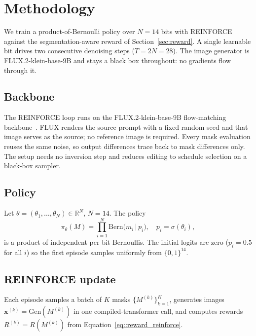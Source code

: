 \chapter{Methodology}
\label{ch:methods}

We train a product-of-Bernoulli policy over $N=14$ bits with REINFORCE against the segmentation-aware reward of Section~\ref{sec:reward}. A single learnable bit drives two consecutive denoising steps ($T=2N=28$). The image generator is FLUX.2-klein-base-9B and stays a black box throughout: no gradients flow through it.

\section{Backbone}

The REINFORCE loop runs on the FLUX.2-klein-base-9B flow-matching backbone~\cite{flux2024}. FLUX renders the source prompt with a fixed random seed and that image serves as the source; no reference image is required. Every mask evaluation reuses the same noise, so output differences trace back to mask differences only. The setup needs no inversion step and reduces editing to schedule selection on a black-box sampler.

\section{Policy}
\label{sec:methods_reinforce}

Let $\theta = (\theta_1,\dots,\theta_N)\in\mathbb{R}^N$, $N=14$. The policy
\begin{equation}
\pi_\theta(M) = \prod_{i=1}^N \text{Bern}\bigl(m_i \,\big|\, p_i\bigr), \quad p_i = \sigma(\theta_i),
\end{equation}
is a product of independent per-bit Bernoullis. The initial logits are zero ($p_i=0.5$ for all $i$) so the first episode samples uniformly from $\{0,1\}^{14}$.

\section{REINFORCE update}
\label{sec:reinforce_update}

Each episode samples a batch of $K$ masks $\{M^{(k)}\}_{k=1}^K$, generates images $\mathbf{x}^{(k)}=\text{Gen}(M^{(k)})$ in one compiled-transformer call, and computes rewards $R^{(k)} = R(M^{(k)})$ from Equation~\ref{eq::reward_reinforce}.

